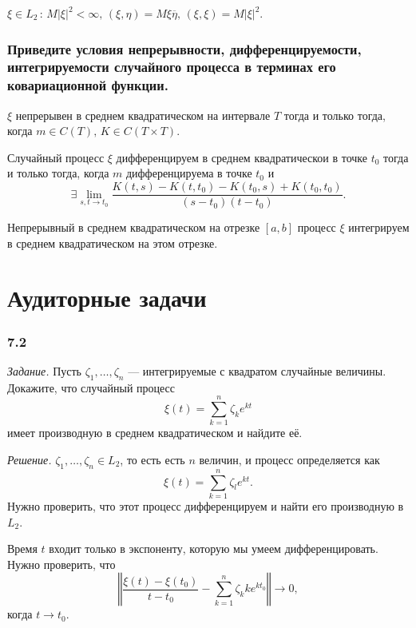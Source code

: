 $ \xi \in L_2 \, : \, M \left| \xi \right|^2 < \infty, \,
  \left( \xi, \eta \right) = M \xi \overline{ \eta }, \,
  \left( \xi, \xi \right) = M \left| \xi \right|^2$.

\subsubsection*{Приведите условия непрерывности, дифференцируемости,
                интегрируемости случайного процесса в терминах его ковариационной функции.}

$ \xi $ непрерывен в среднем квадратическом на интервале $T$ тогда и только тогда,
когда $m \in C \left( T \right), \, K \in C \left( T \times T \right) $.

Случайный процесс $ \xi $ дифференцируем в среднем квадратическои в точке $t_0$
тогда и только тогда, когда $m$ дифференцируема в точке $t_0$ и
$$ \exists \lim \limits_{s, t \to t_0}
    \frac{K \left( t, s \right) - K \left( t, t_0 \right) - K \left( t_0, s \right) + K \left( t_0, t_0 \right) }{ \left( s - t_0 \right) \left( t - t_0 \right) }.$$

Непрерывный в среднем квадратическом на отрезке $ \left[ a, b \right] $ процесс $ \xi $
интегрируем в среднем квадратическом на этом отрезке.

\section*{Аудиторные задачи}

\subsubsection*{7.2}

\textit{Задание.}
Пусть $ \zeta_1, \dotsc, \zeta_n$ --- интегрируемые с квадратом случайные величины.
Докажите, что случайный процесс
$$ \xi \left( t \right) =
  \sum \limits_{k = 1}^n \zeta_k e^{kt}$$
имеет производную в среднем квадратическом и найдите её.

\textit{Решение.}
$ \zeta_1, \dotsc, \zeta_n \in L_2$, то есть есть $n$ величин, и процесс определяется как
$$ \xi \left( t \right) =
  \sum \limits_{k = 1}^n \zeta_l e^{kt}.$$
Нужно проверить, что этот процесс дифференцируем и найти его производную в $L_2$.

Время $t$ входит только в экспоненту, которую мы умеем дифференцировать.
Нужно проверить, что
$$ \left \Vert
    \frac{ \xi \left( t \right) - \xi \left( t_0 \right) }{t - t_0} -
    \sum \limits_{k = 1}^n \zeta_k ke^{kt_0} \right \Vert \to
  0,$$
когда $t \to t_0$.

